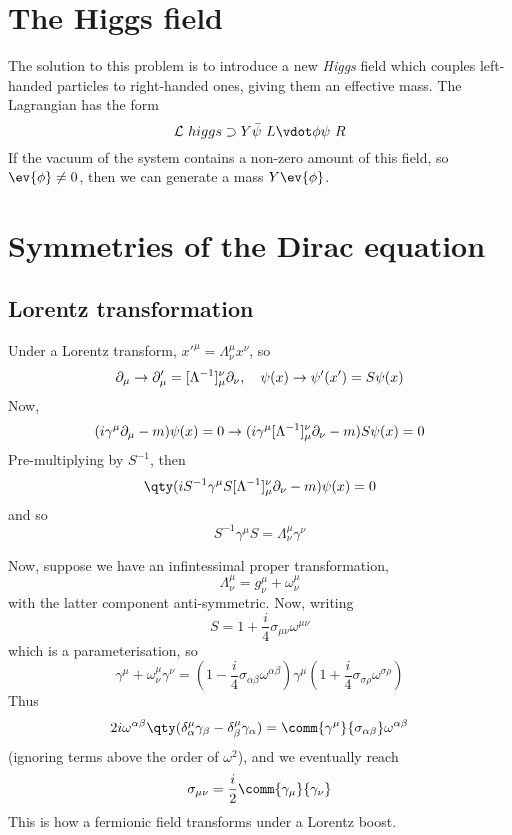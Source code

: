 \section{The Higgs field}
\label{sec:higgs-field}

The solution to this problem is to introduce a new \emph{Higgs} field
which couples left-handed particles to right-handed ones, giving them
an effective mass. The Lagrangian has the form
\begin{equation}
  \label{eq:102}
  \Lag~{higgs} \supset  Y \bar{\psi}~L \vdot \phi \psi~R
\end{equation}
If the vacuum of the system contains a non-zero amount of this field,
so $\ev{\phi} \neq 0$, then we can generate a mass $Y\ev{\phi}$.

\section{Symmetries of the Dirac equation}
\label{sec:symm-dirac-equat}

\subsection{Lorentz transformation}
\label{sec:lorentz-transf}

Under a Lorentz transform, $x'^{\mu} = \Lambda^{\mu}_{\nu} x^{\nu}$,
so
\[ \partial_{\mu} \to \partial_{\mu}' = [\Lambda^{-1}]_{\mu}^{\nu} \partial_{\nu}, \quad \psi(x) \to \psi'(x') = S \psi(x) \]
Now,
\[ (i \gamma^{\mu} \partial_{\mu} - m)\psi(x)=0 \to (i \gamma^{\mu}
[\Lambda^{-1}]^{\nu}_{\mu} \partial_{\nu} - m) S \psi(x) = 0\]
Pre-multiplying by $S^{-1}$, then
\[ \qty( i S^{-1} \gamma^{\mu} S [\Lambda^{-1}]^{\nu}_{\mu} \pd{\nu}-m) \psi(x) = 0 \]
and so
\[ S^{-1} \gamma^{\mu} S = \Lambda^{\mu}_{\nu} \gamma^{\nu} \]

Now, suppose we have an infintessimal proper transformation,
\[ \Lambda^{\mu}_{\nu} = g^{\mu}_{\nu}+ \omega^{\mu}_{\nu} \]
with the latter component anti-symmetric. Now, writing 
\[ S = 1 + \frac{i}{4} \sigma_{\mu \nu} \omega^{\mu \nu} \]
which is a parameterisation, so
\[ \gamma^{\mu} + \omega^{\mu}_{\nu} \gamma^{\nu} = (1-\frac{i}{4} \sigma_{\alpha \beta} \omega^{\alpha \beta}) \gamma^{\mu} (1+ \frac{i}{4} \sigma_{\sigma \rho} \omega^{\sigma \rho}) \]
Thus
\[ 2 i \omega^{\alpha\beta} \qty(\delta^{\mu}_{\alpha} \gamma_{\beta}
- \delta^{\mu}_{\beta} \gamma_{\alpha}) =
\comm{\gamma^{\mu}}{\sigma_{\alpha \beta}} \omega^{\alpha \beta} \]
(ignoring terms above the order of $\omega^2$), and we eventually reach
\[ \sigma_{\mu \nu} = \frac{i}{2} \comm{\gamma_{\mu}}{\gamma_{\nu}} \]
This is how a fermionic field transforms under a Lorentz boost.

